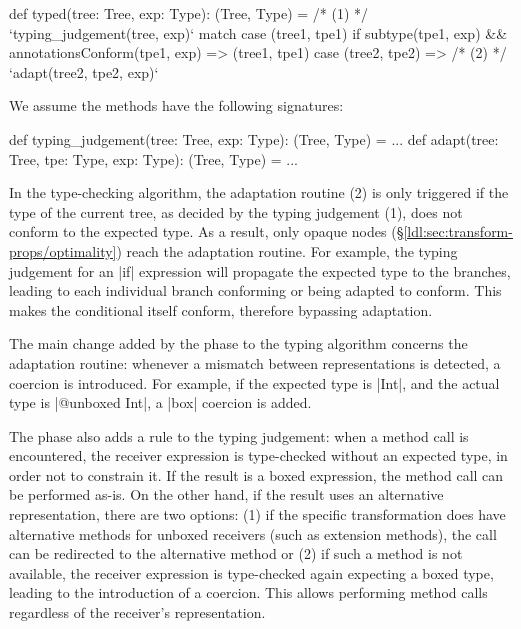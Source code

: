 \begin{lstlisting-nobreak}
 def typed(tree: Tree, exp: Type): (Tree, Type) =
   /* (1) */ `typing_judgement(tree, exp)` match {
     case (tree1, tpe1) if
           subtype(tpe1, exp) &&
           annotationsConform(tpe1, exp) =>
       (tree1, tpe1)
     case (tree2, tpe2) =>
       /* (2) */ `adapt(tree2, tpe2, exp)`
   }
\end{lstlisting-nobreak}

We assume the methods have the following signatures:

\begin{lstlisting-nobreak}
 def typing_judgement(tree: Tree, exp: Type):
                                         (Tree, Type) = ...
 def adapt(tree: Tree, tpe: Type, exp: Type):
                                         (Tree, Type) = ...
\end{lstlisting-nobreak}

In the type-checking algorithm, the adaptation routine (2) is only triggered if the type of the current tree, as decided by the typing judgement (1), does not conform to the expected type. As a result, only opaque nodes (\S\ref{ldl:sec:transform-props/optimality}) reach the adaptation routine. For example, the typing judgement for an |if| expression will propagate the expected type to the branches, leading to each individual branch conforming or being adapted to conform. This makes the conditional itself conform, therefore bypassing adaptation.

The main change added by the \coerce{} phase to the typing algorithm concerns the adaptation routine: whenever a mismatch between representations is detected, a coercion is introduced. For example, if the expected type is |Int|, and the actual type is |@unboxed Int|, a |box| coercion is added.

The \coerce{} phase also adds a rule to the typing judgement: when a method call is encountered, the receiver expression is type-checked without an expected type, in order not to constrain it. If the result is a boxed expression, the method call can be performed as-is. On the other hand, if the result uses an alternative representation, there are two options: (1) if the specific transformation does have alternative methods for unboxed receivers (such as extension methods), the call can be redirected to the alternative method or (2) if such a method is not available, the receiver expression is type-checked again expecting a boxed type, leading to the introduction of a coercion. This allows performing method calls regardless of the receiver's representation.

